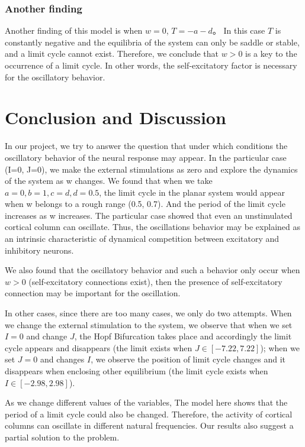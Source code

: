 \documentclass[12pt]{article}
\begin{document}
\subsubsection{Another finding}

Another finding of this model is when $w=0$, $T=-a-d$。 In this case $T$ is constantly negative and the equilibria of the system can only be saddle or stable, and a limit cycle cannot exist. Therefore, we conclude that $w>0$ is a key to the occurrence of a limit cycle. In other words, the self-excitatory factor is necessary for the oscillatory behavior. 

\section{ Conclusion and Discussion} 

In our project, we try to answer the question that under which conditions the oscillatory behavior of the neural response may appear. In the particular case (I=0, J=0), we make the external stimulations as zero and explore the dynamics of the system as w changes. We found that when we take $a=0,b=1,c=d,d=0.5$, the limit cycle in the planar system would appear when w belongs to a rough range (0.5, 0.7). And the period of the limit cycle increases as w increases. The particular case showed that even an unstimulated cortical column can oscillate. Thus, the oscillations behavior may be explained as an intrinsic characteristic of dynamical competition between excitatory and inhibitory neurons. 

We also found that the oscillatory behavior and such a behavior only occur when $w>0$ (self-excitatory connections exist), then the presence of self-excitatory connection may be important for the oscillation. 

In other cases, since there are too many cases, we only do two attempts. When we change the external stimulation to the system, we observe that when we set $I=0$ and change $J$, the Hopf Bifurcation takes place and accordingly the limit cycle appears and disappears (the limit exists when $J\in [-7.22,7.22]$); when we set $J=0$ and changes $I$, we observe the position of limit cycle changes and it disappears when enclosing other equilibrium (the limit cycle exists when $I \in [-2.98,2.98]$).

As we change different values of the variables, The model here shows that the period of a limit cycle could also be changed. Therefore, the activity of cortical columns can oscillate in different natural frequencies. Our results also suggest a partial solution to the  problem.
\end{document}
